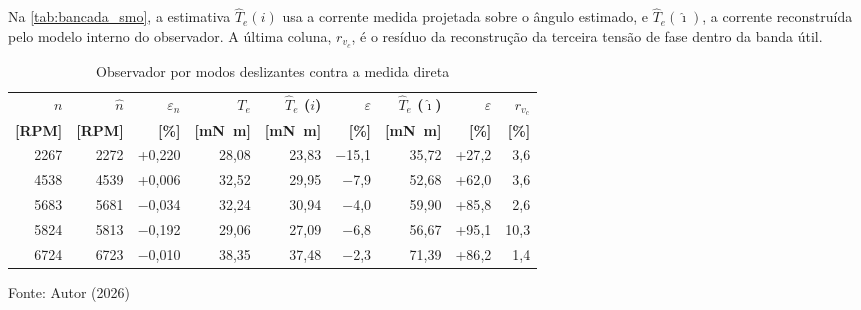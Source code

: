 Na \autoref{tab:bancada_smo}, a estimativa
$\hat T_e(i)$ usa a corrente medida projetada sobre o ângulo estimado, e
$\hat T_e(\hat\imath)$, a corrente reconstruída pelo modelo interno do
observador. A última coluna, $r_{v_c}$, é o resíduo da reconstrução da
terceira tensão de fase dentro da banda útil.

\begin{table}[H]
    \centering
    \caption{Observador por modos deslizantes contra a medida direta}
    \label{tab:bancada_smo}
    \small
    \begin{tabular}{rrrrrrrrr}
        \toprule
        \textbf{$n$} & \textbf{$\hat n$} & \textbf{$\varepsilon_n$} & \textbf{$T_e$} & \textbf{$\hat T_e$ ($i$)} & \textbf{$\varepsilon$} & \textbf{$\hat T_e$ ($\hat\imath$)} & \textbf{$\varepsilon$} & \textbf{$r_{v_c}$} \\
        \textbf{[RPM]} & \textbf{[RPM]} & \textbf{[\si{\percent}]} & \textbf{[\si{\milli\newton\meter}]} & \textbf{[\si{\milli\newton\meter}]} & \textbf{[\si{\percent}]} & \textbf{[\si{\milli\newton\meter}]} & \textbf{[\si{\percent}]} & \textbf{[\si{\percent}]} \\
        \midrule
        2267 & 2272 & +0{,}220 & 28{,}08 & 23{,}83 & $-$15{,}1 & 35{,}72 & +27{,}2 & 3{,}6 \\
        4538 & 4539 & +0{,}006 & 32{,}52 & 29{,}95 & $-$7{,}9 & 52{,}68 & +62{,}0 & 3{,}6 \\
        5683 & 5681 & $-$0{,}034 & 32{,}24 & 30{,}94 & $-$4{,}0 & 59{,}90 & +85{,}8 & 2{,}6 \\
        5824 & 5813 & $-$0{,}192 & 29{,}06 & 27{,}09 & $-$6{,}8 & 56{,}67 & +95{,}1 & 10{,}3 \\
        6724 & 6723 & $-$0{,}010 & 38{,}35 & 37{,}48 & $-$2{,}3 & 71{,}39 & +86{,}2 & 1{,}4 \\
        \bottomrule
    \end{tabular}


    \vspace{2pt}
    {\small Fonte: Autor (2026)}
\end{table}
